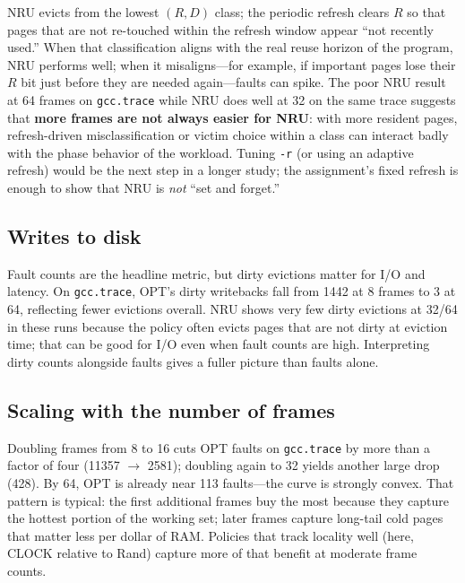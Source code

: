 \documentclass[11pt]{article}
\begin{document}
NRU evicts from the lowest $(R,D)$ class; the periodic refresh clears $R$ so that pages that are not re-touched within the refresh window appear ``not recently used.'' When that classification aligns with the real reuse horizon of the program, NRU performs well; when it misaligns---for example, if important pages lose their $R$ bit just before they are needed again---faults can spike. The poor NRU result at \num{64} frames on \texttt{gcc.trace} while NRU does well at \num{32} on the same trace suggests that \textbf{more frames are not always easier for NRU}: with more resident pages, refresh-driven misclassification or victim choice within a class can interact badly with the phase behavior of the workload. Tuning \texttt{-r} (or using an adaptive refresh) would be the next step in a longer study; the assignment's fixed refresh is enough to show that NRU is \emph{not} ``set and forget.''

\subsection{Writes to disk}

Fault counts are the headline metric, but dirty evictions matter for I/O and latency. On \texttt{gcc.trace}, OPT's dirty writebacks fall from \num{1442} at \num{8} frames to \num{3} at \num{64}, reflecting fewer evictions overall. NRU shows very few dirty evictions at \num{32}/\num{64} in these runs because the policy often evicts pages that are not dirty at eviction time; that can be good for I/O even when fault counts are high. Interpreting dirty counts alongside faults gives a fuller picture than faults alone.

\subsection{Scaling with the number of frames}

Doubling frames from \num{8} to \num{16} cuts OPT faults on \texttt{gcc.trace} by more than a factor of four (\num{11357} $\rightarrow$ \num{2581}); doubling again to \num{32} yields another large drop (\num{428}). By \num{64}, OPT is already near \num{113} faults---the curve is strongly convex. That pattern is typical: the first additional frames buy the most because they capture the hottest portion of the working set; later frames capture long-tail cold pages that matter less per dollar of RAM. Policies that track locality well (here, CLOCK relative to Rand) capture more of that benefit at moderate frame counts.
\end{document}
